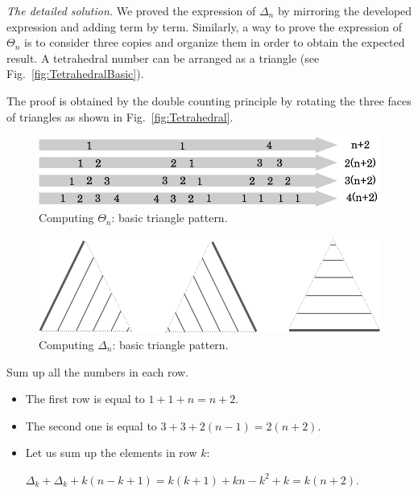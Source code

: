 \noindent \textit{The detailed solution.}
We proved the expression of $\Delta_n$ by mirroring the developed expression and adding term by term.
Similarly, a way to prove the expression of $\Theta_n$ is to consider three copies and organize them 
in order to obtain the expected result.
A tetrahedral number can be arranged as a triangle (see Fig.~\ref{fig:TetrahedralBasic}).

The proof is obtained by the double counting principle by rotating the three faces of triangles as shown in Fig.~\ref{fig:Tetrahedral}.
\begin{figure}[h]
\begin{center}
        \includegraphics[scale=0.3]{FiguresArithmetic/appTetrahedral3}
        \caption{Computing $\Theta_n$: basic triangle pattern.}
        \label{fig:Tetrahedral3}
\end{center}
\end{figure}

\begin{figure}[h]
\begin{center}
        \includegraphics[scale=0.3]{FiguresArithmetic/appTetrahedral1}
        \caption{Computing $\Delta_n$: basic triangle pattern.}
        \label{fig:Tetrahedral1}
\end{center}
\end{figure}


Sum up all the numbers in each row.

\begin{itemize}
\item 
The first row is equal to $1+1+n = n+2$.
\item
The second one is equal to $3 + 3 + 2(n-1) = 2(n+2)$. 
\item
Let us sum up the elements in row $k$: 

$\Delta_k + \Delta_k + k(n-k+1)  = k(k+1) + kn-k^2+k = k(n+2)$.
\end{itemize}

